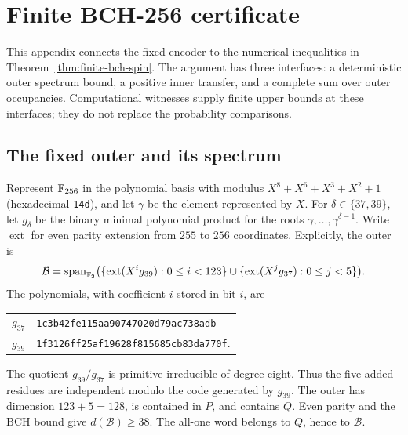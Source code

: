 \section{Finite BCH-256 certificate}
\label{app:finite-bch-proof}
\label{app:structured-finite-member}

This appendix connects the fixed encoder to the numerical inequalities in
Theorem~\ref{thm:finite-bch-spin}. The argument has three interfaces: a
deterministic outer spectrum bound, a positive inner transfer, and a complete
sum over outer occupancies. Computational witnesses supply finite upper
bounds at these interfaces; they do not replace the probability comparisons.

\subsection{The fixed outer and its spectrum}
\label{app:finite-bch-definition}

Represent $\mathbb F_{256}$ in the polynomial basis with modulus
$X^8+X^6+X^3+X^2+1$ (hexadecimal \texttt{14d}), and let $\gamma$ be the
element represented by $X$. For $\delta\in\{37,39\}$, let $g_\delta$ be the
binary minimal polynomial product for the roots
$\gamma,\ldots,\gamma^{\delta-1}$. Write $\operatorname{ext}$ for even
parity extension from $255$ to $256$ coordinates. Explicitly, the outer is
\[
 \mathcal B=\operatorname{span}_{\mathbb F_2}
 \bigl(\{\operatorname{ext}(X^i g_{39}):0\le i<123\}
 \cup\{\operatorname{ext}(X^j g_{37}):0\le j<5\}\bigr).
\]
The polynomials, with coefficient $i$ stored in bit $i$, are
\begin{center}
\begin{tabular}{@{}ll@{}}
$g_{37}$ & \texttt{1c3b42fe115aa90747020d79ac738adb}\\
$g_{39}$ & \texttt{1f3126ff25af19628f815685cb83da770f}.
\end{tabular}
\end{center}
The quotient $g_{39}/g_{37}$ is primitive irreducible of degree eight.
Thus the five added residues are independent modulo the code generated by
$g_{39}$. The outer has dimension $123+5=128$, is contained in $P$, and
contains $Q$. Even parity and the BCH bound give $d(\mathcal B)\ge38$.
The all-one word belongs to $Q$, hence to $\mathcal B$.

